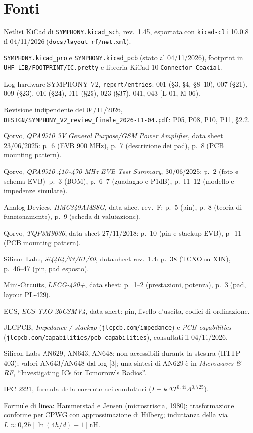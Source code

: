 \documentclass[a4paper,10pt]{article}
\begin{document}
\section{Fonti}
\label{app:fonti}
{\small
\begin{enumerate}[label={[\arabic*]}]
\item Netlist KiCad di \texttt{SYMPHONY.kicad\_sch}, rev.~1.45, esportata con \texttt{kicad-cli} 10.0.8 il
      04/11/2026 (\texttt{docs/layout\_rf/net.xml}).
\item \texttt{SYMPHONY.kicad\_pro} e \texttt{SYMPHONY.kicad\_pcb} (stato al 04/11/2026), footprint in
      \texttt{UHF\_LIB/FOOTPRINT/IC.pretty} e libreria KiCad 10 \texttt{Connector\_Coaxial}.
\item Log hardware SYMPHONY V2, \texttt{report/entries}: 001 (\S3, \S4, \S8--10), 007 (\S21), 009
      (\S23), 010 (\S24), 011 (\S25), 023 (\S37), 041, 043 (L-01, M-06).
\item Revisione indipendente del 04/11/2026, \texttt{DESIGN/SYMPHONY\_V2\_review\_finale\_2026-11-04.pdf}:
      P05, P08, P10, P11, \S2.2.
\item Qorvo, \emph{QPA9510 3V General Purpose/GSM Power Amplifier}, data sheet 23/06/2025: p.~6 (EVB 900 MHz),
      p.~7 (descrizione dei pad), p.~8 (PCB mounting pattern).
\item Qorvo, \emph{QPA9510 410--470 MHz EVB Test Summary}, 30/06/2025: p.~2 (foto e schema EVB), p.~3 (BOM),
      p.~6--7 (guadagno e P1dB), p.~11--12 (modello e impedenze simulate).
\item Analog Devices, \emph{HMC349AMS8G}, data sheet rev.~F: p.~5 (pin), p.~8 (teoria di funzionamento),
      p.~9 (scheda di valutazione).
\item Qorvo, \emph{TQP3M9036}, data sheet 27/11/2018: p.~10 (pin e stackup EVB), p.~11 (PCB mounting pattern).
\item Silicon Labs, \emph{Si4464/63/61/60}, data sheet rev.~1.4: p.~38 (TCXO su XIN), p.~46--47 (pin, pad esposto).
\item Mini-Circuits, \emph{LFCG-490+}, data sheet: p.~1--2 (prestazioni, potenza), p.~3 (pad, layout PL-429).
\item ECS, \emph{ECS-TXO-20CSMV4}, data sheet: pin, livello d'uscita, codici di ordinazione.
\item JLCPCB, \emph{Impedance / stackup} (\texttt{jlcpcb.com/impedance}) e \emph{PCB capabilities}
      (\texttt{jlcpcb.com/capabilities/pcb-capabilities}), consultati il 04/11/2026.
\item Silicon Labs AN629, AN643, AN648: non accessibili durante la stesura (HTTP 403); valori AN643/AN648 dal log
      [3]; una sintesi di AN629 è in \emph{Microwaves \& RF}, \enquote{Investigating ICs for Tomorrow's Radios}.
\item IPC-2221, formula della corrente nei conduttori ($I=k\Delta T^{0{,}44}A^{0{,}725}$).
\item Formule di linea: Hammerstad e Jensen (microstriscia, 1980); trasformazione conforme per CPWG con
      approssimazione di Hilberg; induttanza della via $L\approx0{,}2h[\ln(4h/d)+1]$\,nH.
\end{enumerate}}
\end{document}

